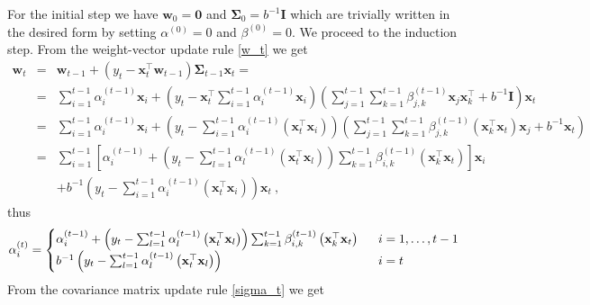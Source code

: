 For the initial step we have $\mathbf{w}_{0}=\mathbf{0}$ and $\mathbf{\Sigma}_{0}=b^{-1}\mathbf{I}$
which are trivially written in the desired form by setting $\alpha^{\left(0\right)}=0$
and $\beta^{\left(0\right)}=0$. We proceed to the induction step.
From the weight-vector update rule \eqref{w_t} we get
\begin{eqnarray*}
\mathbf{w}_{t} & = & \mathbf{w}_{t-1}+\left(y_{t}-\mathbf{x}_{t}^{\top}\mathbf{w}_{t-1}\right)\mathbf{\Sigma}_{t-1}\mathbf{x}_{t}=\\
 & = & \sum_{i=1}^{t-1}\alpha_{i}^{\left(t-1\right)}\mathbf{x}_{i}+\left(y_{t}-\mathbf{x}_{t}^{\top}\sum_{i=1}^{t-1}\alpha_{i}^{\left(t-1\right)}\mathbf{x}_{i}\right)\left(\sum_{j=1}^{t-1}\sum_{k=1}^{t-1}\beta_{j,k}^{\left(t-1\right)}\mathbf{x}_{j}\mathbf{x}_{k}^{\top}+b^{-1}\mathbf{I}\right)\mathbf{x}_{t}\\
 & = & \sum_{i=1}^{t-1}\alpha_{i}^{\left(t-1\right)}\mathbf{x}_{i}+\left(y_{t}-\sum_{i=1}^{t-1}\alpha_{i}^{\left(t-1\right)}\left(\mathbf{x}_{t}^{\top}\mathbf{x}_{i}\right)\right)\left(\sum_{j=1}^{t-1}\sum_{k=1}^{t-1}\beta_{j,k}^{\left(t-1\right)}\left(\mathbf{x}_{k}^{\top}\mathbf{x}_{t}\right)\mathbf{x}_{j}+b^{-1}\mathbf{x}_{t}\right)\\
 & = & \sum_{i=1}^{t-1}\left[\alpha_{i}^{\left(t-1\right)}+\left(y_{t}-\sum_{l=1}^{t-1}\alpha_{l}^{\left(t-1\right)}\left(\mathbf{x}_{t}^{\top}\mathbf{x}_{l}\right)\right)\sum_{k=1}^{t-1}\beta_{i,k}^{\left(t-1\right)}\left(\mathbf{x}_{k}^{\top}\mathbf{x}_{t}\right)\right]\mathbf{x}_{i}\\
 &&+b^{-1}\left(y_{t}-\sum_{i=1}^{t-1}\alpha_{i}^{\left(t-1\right)}\left(\mathbf{x}_{t}^{\top}\mathbf{x}_{i}\right)\right)\mathbf{x}_{t}~,
\end{eqnarray*}
 thus
\[
\alpha_{i}^{\left(t\right)}=\begin{cases}
\alpha_{i}^{\left(t-1\right)}+\left(y_{t}-\sum_{l=1}^{t-1}\alpha_{l}^{\left(t-1\right)}\left(\mathbf{x}_{t}^{\top}\mathbf{x}_{l}\right)\right)\sum_{k=1}^{t-1}\beta_{i,k}^{\left(t-1\right)}\left(\mathbf{x}_{k}^{\top}\mathbf{x}_{t}\right) & ~~ i=1 , \ldots , t-1\\
b^{-1}\left(y_{t}-\sum_{l=1}^{t-1}\alpha_{l}^{\left(t-1\right)}\left(\mathbf{x}_{t}^{\top}\mathbf{x}_{l}\right)\right) & ~~ i=t
\end{cases}
\]
From the covariance matrix update rule \eqref{sigma_t} we get
